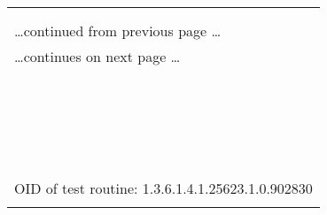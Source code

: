 \documentclass{article}
\begin{document}
\begin{longtable}{|p{}|}
\hline
\rowcolor{openvas_warning}{\color{white}{Medium (CVSS: 4.3) }}\\
\rowcolor{openvas_warning}{\color{white}{NVT: Apache HTTP Server 'httpOnly' Cookie Information Disclosure Vulnerability}}\\
\hline
\endfirsthead
\hfill\ldots continued from previous page \ldots \\
\hline
\endhead
\hline
\ldots continues on next page \ldots \\
\endfoot
\hline
\endlastfoot
\\
\rowcolor{white}{\verb=  Summary:=}\\
\rowcolor{white}{\verb=  This host is running Apache HTTP Server and is prone to cookie=}\\
\rowcolor{white}{\verb=  information disclosure vulnerability.=}\\
\rowcolor{white}{\verb=  Vulnerability Insight:=}\\
\rowcolor{white}{\verb=  The flaw is due to an error within the default error response for=}\\
\rowcolor{white}{\verb=  status code 400 when no custom ErrorDocument is configured, which can be=}\\
\rowcolor{white}{\verb=  exploited to expose 'httpOnly' cookies.=}\\
\rowcolor{white}{\verb=  Impact:=}\\
\rowcolor{white}{\verb=  Successful exploitation will allow attackers to obtain sensitive information=}\\
\rowcolor{white}{\verb=  that may aid in further attacks.=}\\
\rowcolor{white}{\verb=  Impact Level: Application=}\\
\rowcolor{white}{\verb=  Affected Software/OS:=}\\
\rowcolor{white}{\verb=  Apache HTTP Server versions 2.2.0 through 2.2.21=}\\
\rowcolor{white}{\verb=  Solution:=}\\
\rowcolor{white}{\verb=  Upgrade to Apache HTTP Server version 2.2.22 or later,=}\\
\rowcolor{white}{\verb=  For updates refer to http://httpd.apache.org/=}\\
\rowcolor{white}{\verb==}\\
\rowcolor{white}{\verb==}\\
\\
OID of test routine: 1.3.6.1.4.1.25623.1.0.902830\\
\\


\end{longtable}
\end{document}
